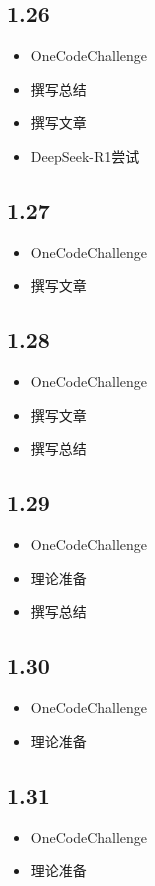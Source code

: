 \documentclass[UTF8]{ctexart}
\begin{document}
\subsection*{1.26}
\begin{itemize}
    \item OneCodeChallenge
    \item 撰写总结
    \item 撰写文章
    \item DeepSeek-R1尝试
\end{itemize}

\subsection*{1.27}
\begin{itemize}
    \item OneCodeChallenge
    \item 撰写文章
\end{itemize}

\subsection*{1.28}
\begin{itemize}
    \item OneCodeChallenge
    \item 撰写文章
    \item 撰写总结
\end{itemize}

\subsection*{1.29}
\begin{itemize}
    \item OneCodeChallenge
    \item 理论准备
    \item 撰写总结
\end{itemize}

\subsection*{1.30}
\begin{itemize}
    \item OneCodeChallenge
    \item 理论准备
\end{itemize}

\subsection*{1.31}
\begin{itemize}
    \item OneCodeChallenge
    \item 理论准备
\end{itemize}
\end{document}
